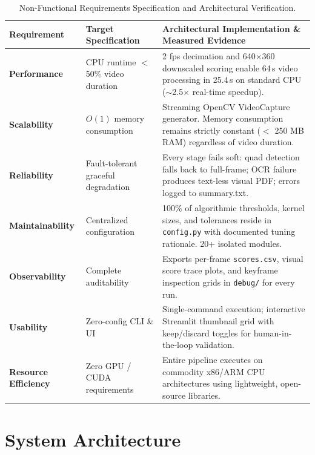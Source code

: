 \documentclass[10pt,a4paper]{article}
\begin{document}
\begin{table}[h!]
\small
\centering
\begin{tabularx}{\textwidth}{@{} p{28mm} p{40mm} X @{}}
\toprule
\rowcolor{slate}\color{white}\textbf{Requirement} & \color{white}\textbf{Target Specification} & \color{white}\textbf{Architectural Implementation \& Measured Evidence} \\
\midrule
\textbf{Performance} & CPU runtime $<$ 50\% video duration & 2 fps decimation and 640$\times$360 downscaled scoring enable 64\,s video processing in 25.4\,s on standard CPU ($\sim$2.5$\times$ real-time speedup). \\
\textbf{Scalability} & $O(1)$ memory consumption & Streaming OpenCV VideoCapture generator. Memory consumption remains strictly constant ($<$ 250 MB RAM) regardless of video duration. \\
\textbf{Reliability} & Fault-tolerant graceful degradation & Every stage fails soft: quad detection falls back to full-frame; OCR failure produces text-less visual PDF; errors logged to summary.txt. \\
\textbf{Maintainability} & Centralized configuration & 100\% of algorithmic thresholds, kernel sizes, and tolerances reside in \texttt{config.py} with documented tuning rationale. 20+ isolated modules. \\
\textbf{Observability} & Complete auditability & Exports per-frame \texttt{scores.csv}, visual score trace plots, and keyframe inspection grids in \texttt{debug/} for every run. \\
\textbf{Usability} & Zero-config CLI \& UI & Single-command execution; interactive Streamlit thumbnail grid with keep/discard toggles for human-in-the-loop validation. \\
\textbf{Resource Efficiency} & Zero GPU / CUDA requirements & Entire pipeline executes on commodity x86/ARM CPU architectures using lightweight, open-source libraries. \\
\bottomrule
\end{tabularx}
\caption{Non-Functional Requirements Specification and Architectural Verification.}
\end{table}

\newpage

\section{System Architecture}
\end{document}
